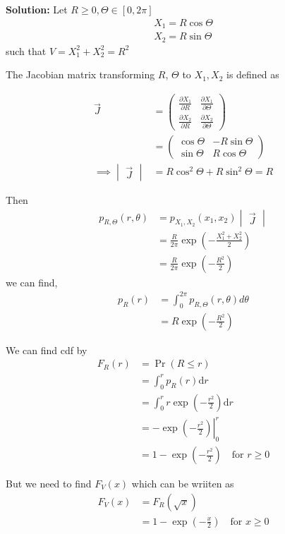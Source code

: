 \documentclass[journal,12pt,twocolumn]{IEEEtran}
\newcommand{\myvec}[1]{\ensuremath{\begin{pmatrix}#1\end{pmatrix}}}
\newcommand{\mydet}[1]{\ensuremath{\begin{vmatrix}#1\end{vmatrix}}}
\newcommand{\solution}{\noindent \textbf{Solution: }}
\providecommand{\pr}[1]{\ensuremath{\Pr\left(#1\right)}}
\providecommand{\brak}[1]{\ensuremath{\left(#1\right)}}
\providecommand{\der}[1]{\mathrm{d} #1}
\numberwithin{equation}{section}
\renewcommand\thesection{\arabic{section}}
\begin{document}
\begin{enumerate}[label=\thesection.\arabic*,ref=\thesection.\theenumi]
	\solution Let $R \ge 0, \Theta \in [0, 2\pi]$
	\begin{align}
		X_1 = R\cos\Theta  \\
		X_2 = R\sin\Theta 
	\end{align}
	such that $V = X_1^2 + X_2^2 = R^2$
	 
	 The Jacobian matrix transforming $R$, $\Theta$ to $X_1, X_2$  is defined as 
	 
	\begin{align}
		\vec{J} &= \myvec{
			\frac{\partial X_1}{\partial R} & \frac{\partial X_1}{\partial \Theta} \\
			\frac{\partial X_2}{\partial R} & \frac{\partial X_2}{\partial \Theta}
		} \\
		&= \myvec{
			\cos\Theta & -R\sin\Theta \\
			\sin\Theta & R\cos\Theta
		} \\
		\implies \mydet{\vec{J}} &= R\cos^2\Theta + R\sin^2\Theta = R
	\end{align}
	
	Then
		\begin{align}
		p_{R, \Theta} \brak{r, \theta} &= p_{X_1,X_2}\brak{x_1,x_2} \mydet{\vec{J}} \\
			&= \frac{R}{2\pi}\exp{\brak{-\frac{X_1^2 + X_2^2}{2}}} \\
			&= \frac{R}{2\pi}\exp{\brak{-\frac{R^2}{2}}}
			\label{eq:joint}
		\end{align}
we can find,
		\begin{align}
			p_R(r) &= \int_{0}^{2\pi}p_{R, \Theta}(r, \theta)d\theta \\
			&= R\exp{\brak{-\frac{R^2}{2}}}
		\end{align}
		
	We can find cdf by
	\begin{align}
		F_R(r) &= \pr{R \le r} \\
		&= \int_0^r p_R(r) \der{r} \\
		&= \int_0^r r \exp\brak{-\frac{r^2}{2}} \der{r} \\
		&= - \left. \exp\brak{-\frac{r^2}{2}} \right|_0^r \\
		&= 1 - \exp\brak{-\frac{r^2}{2}} \quad \text{for } r \ge 0
	\end{align}		
	
	But we need to find $ F_V(x) $ which can be wriiten as
	\begin{align}
		F_V(x) &= F_R(\sqrt{x}) \\
		&= 1 - \exp\brak{-\frac{x}{2}} \quad \text{for } x \ge 0
	\end{align}
	

\end{enumerate}
\end{document}
